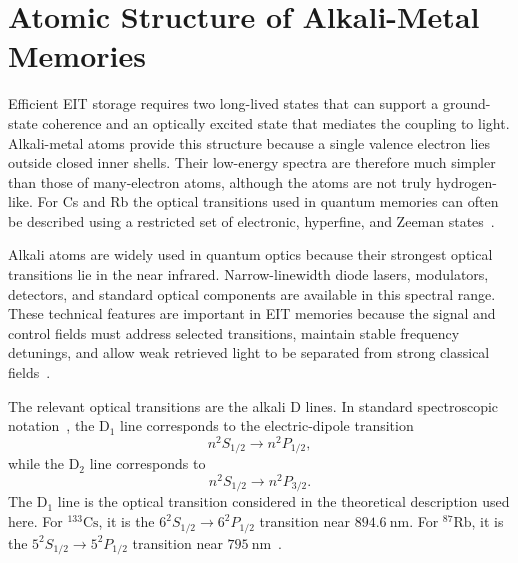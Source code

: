 \section{Atomic Structure of Alkali-Metal Memories}
\label{sec:atomic_structure}

Efficient EIT storage requires two long-lived states that can support a ground-state coherence and an optically excited state that mediates the coupling to light. Alkali-metal atoms provide this structure because a single valence electron lies outside closed inner shells. Their low-energy spectra are therefore much simpler than those of many-electron atoms, although the atoms are not truly hydrogen-like. For Cs and Rb the optical transitions used in quantum memories can often be described using a restricted set of electronic, hyperfine, and Zeeman states~\cite{Apgteitiav_FinkelsteinEtAl_2023,Oqmboeit_MaEtAl_2017}.

Alkali atoms are widely used in quantum optics because their strongest optical transitions lie in the near infrared. Narrow-linewidth diode lasers, modulators, detectors, and standard optical components are available in this spectral range. These technical features are important in EIT memories because the signal and control fields must address selected transitions, maintain stable frequency detunings, and allow weak retrieved light to be separated from strong classical fields~\cite{Apgteitiav_FinkelsteinEtAl_2023,Oqmboeit_MaEtAl_2017}.

The relevant optical transitions are the alkali D lines. In standard spectroscopic notation~\cite{Steck_CsDLine,Steck_Rb87DLine}, the D$_1$ line corresponds to the electric-dipole transition
\begin{equation}
    n^2S_{1/2} \rightarrow n^2P_{1/2},
    \label{eq:d1_transition}
\end{equation}
while the D$_2$ line corresponds to
\begin{equation}
    n^2S_{1/2} \rightarrow n^2P_{3/2}.
    \label{eq:d2_transition}
\end{equation}
The D$_1$ line is the optical transition considered in the theoretical description used here. For \({}^{133}\mathrm{Cs}\), it is the \(6^2S_{1/2}\rightarrow6^2P_{1/2}\) transition near \(\SI{894.6}{\nano\metre}\). For \({}^{87}\mathrm{Rb}\), it is the \(5^2S_{1/2}\rightarrow5^2P_{1/2}\) transition near \(\SI{795}{\nano\metre}\)~\cite{Steck_CsDLine,Steck_Rb87DLine,Oqmboeit_MaEtAl_2017}.

